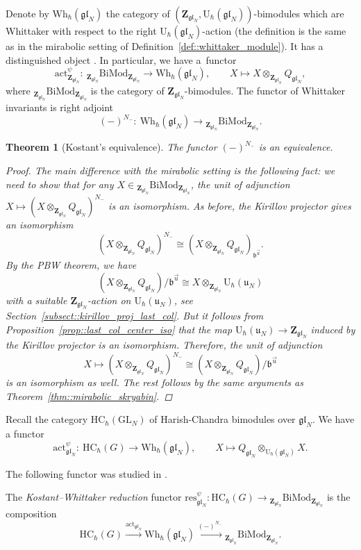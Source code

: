 \documentclass[10pt,a4paper]{article}
\numberwithin{equation}{section}
\newtheorem{Theorem}{Theorem}[section]
\newcommand{\U}{\mathrm{U}_{\hbar}}
\newcommand{\Z}{\mathbf{Z}}
\newcommand{\GL}{\mathrm{GL}}
\renewcommand{\b}{\mathfrak{b}}
\newcommand{\n}{\mathfrak{n}}
\renewcommand{\u}{\mathfrak{u}}
\newcommand{\Wh}{\mathrm{Wh}_{\hbar}}
\newcommand{\act}{\mathrm{act}}
\newcommand{\BiMod}[2]{{}_{#1}\mathrm{BiMod}_{#2}}
\newcommand{\HC}{\mathrm{HC}_{\hbar}}
\newcommand{\res}{\mathrm{res}}
\newcommand{\gl}{\mathfrak{gl}}
\begin{document}
	Denote by $\Wh(\gl_N)$ the category of $(\Z_{\gl_N},\U(\gl_N))$-bimodules which are Whittaker with respect to the right $\U(\gl_N)$-action (the definition is the same as in the mirabolic setting of Definition~\ref{def::whittaker_module}). It has a distinguished object \smash{$Q_{\gl_N} = \n_-^{\psi} \backslash \U(\gl_N)$}. In particular, we have a~functor
	\[
	\act_{\Z_{\gl_N}}^{\psi} \colon\ \BiMod{\Z_{\gl_N}}{\Z_{\gl_N}}\rightarrow \Wh(\gl_N), \qquad X \mapsto X \otimes_{\Z_{\gl_N}} Q_{\gl_N},
	\]
	where $\BiMod{\Z_{\gl_N}}{\Z_{\gl_N}}$ is the category of $\Z_{\gl_N}$-bimodules. The functor of Whittaker invariants is right adjoint
	\[
	(-)^{N_-} \colon\ \Wh(\gl_N) \rightarrow \BiMod{\Z_{\gl_N}}{\Z_{\gl_N}}.
	\]
	
	\begin{Theorem}[Kostant's equivalence]
		\label{thm::gl_skryabin}
		The functor $(-)^{N_-}$ is an equivalence.
		\begin{proof}
			The main difference with the mirabolic setting is the following fact: we need to show that for any $X \in \BiMod{\Z_{\gl_N}}{\Z_{\gl_N}}$, the unit of adjunction
$
			X \mapsto (X \otimes_{\Z_{\gl_N}} Q_{\gl_N})^{N_-}
$
			is an isomorphism. As before, the Kirillov projector gives an isomorphism
			\[
			(X \otimes_{\Z_{\gl_N}} Q_{\gl_N})^{N_-} \cong (X \otimes_{\Z_{\gl_N}} Q_{\gl_N})_{\b^{\vec{u}}}.
			\]
			By the PBW theorem, we have
			\[
			(X \otimes_{\Z_{\gl_N}} Q_{\gl_N})/\b^{\vec{u}} \cong X \otimes_{\Z_{\gl_N}} \U(\u_N)
			\]
			with a suitable $\Z_{\gl_N}$-action on $\U(\u_N)$, see Section~\ref{subsect::kirillov_proj_last_col}. But it follows from Proposition~\ref{prop::last_col_center_iso} that the map $\U(\u_N) \rightarrow \Z_{\gl_N}$ induced by the Kirillov projector is an isomorphism. Therefore, the unit of adjunction
			\[
			X \mapsto (X \otimes_{\Z_{\gl_N}} Q_{\gl_N})^{N_-} \cong (X \otimes_{\Z_{\gl_N}} Q_{\gl_N})/\b^{\vec{u}}
			\]
			is an isomorphism as well. The rest follows by the same arguments as Theorem~\ref{thm::mirabolic_skryabin}.
		\end{proof}
	\end{Theorem}
	
	Recall the category $\HC(\GL_N)$ of Harish-Chandra bimodules over $\gl_N$. We have a functor
	\[
	\act_{\gl_N}^{\psi}\colon\ \HC(G) \rightarrow \Wh(\gl_N), \qquad X \mapsto Q_{\gl_N} \otimes_{\U(\gl_N)} X.
	\]
	
	The following functor was studied in \cite{BezrukavnikovFinkelberg}.
	\begin{Definition}
		The \emph{Kostant--Whittaker reduction} functor $\res_{\gl_N}^{\psi} \colon \HC(G) \rightarrow \BiMod{\Z_{\gl_N}}{\Z_{\gl_N}}$ is the composition
		\[
		\HC(G) \xrightarrow{\act_{\gl_N}} \Wh(\gl_N) \xrightarrow{(-)^{N_-}} \BiMod{\Z_{\gl_N}}{\Z_{\gl_N}}.
		\]
	\end{Definition}
	
\end{document}
